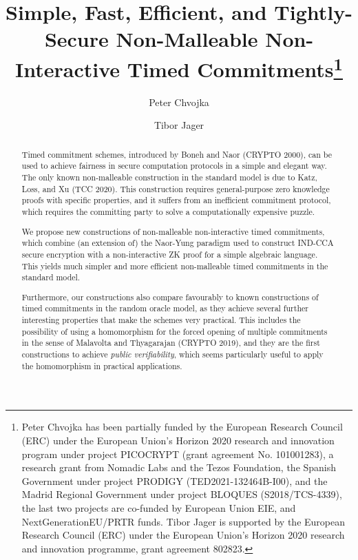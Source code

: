 \documentclass{llncs}
\author{\vspace{-5mm}}
\institute{\vspace{-5mm}}
\author{Peter Chvojka\inst{1} \and Tibor Jager\inst{2}}
\institute{IMDEA Software Institute, Madrid, Spain, \url{chvojka.p@gmail.com} \and University of Wuppertal, Wuppertal, Germany, \url{jager@uni-wuppertal.de}}
\begin{document}
\title{Simple, Fast, Efficient, and Tightly-Secure Non-Malleable Non-Interactive Timed Commitments\thanks{Peter Chvojka has been partially funded by the European Research Council (ERC) under the European Union’s Horizon 2020 research and innovation program under project PICOCRYPT (grant agreement No. 101001283), a research grant from Nomadic Labs and the Tezos Foundation, the Spanish Government under project PRODIGY (TED2021-132464B-I00), and the Madrid Regional Government under project BLOQUES (S2018/TCS-4339), the last two projects are co-funded by European Union EIE, and NextGenerationEU/PRTR funds.
Tibor Jager is supported by the European Research Council (ERC) under the European Union's Horizon 2020 research and innovation programme, grant agreement 802823.}}



\maketitle
\begin{abstract}
Timed commitment schemes, introduced by Boneh and Naor (CRYPTO 2000), can be used to achieve fairness in secure computation protocols in a simple and elegant way.
The only known non-malleable construction in the standard model is due to Katz, Loss, and Xu (TCC 2020). This construction requires general-purpose zero knowledge proofs with specific properties, and it suffers from an inefficient commitment protocol, which requires the committing party to solve a computationally expensive puzzle.

We propose new constructions of non-malleable non-interactive timed commitments, which combine (an extension of) the Naor-Yung paradigm used to construct IND-CCA secure encryption with a non-interactive ZK proof for a simple algebraic language. This yields much simpler and more efficient non-malleable timed commitments in the standard model.

Furthermore, our constructions also compare favourably to known constructions of timed commitments in the random oracle model, as they achieve several further interesting properties that make the schemes very practical. This includes the possibility of using a homomorphism for the forced opening of multiple commitments in the sense of Malavolta and Thyagarajan (CRYPTO 2019), and they are the first constructions to achieve \emph{public verifiability}, which seems particularly useful to apply the homomorphism in practical applications.
\end{abstract}
\end{document}
